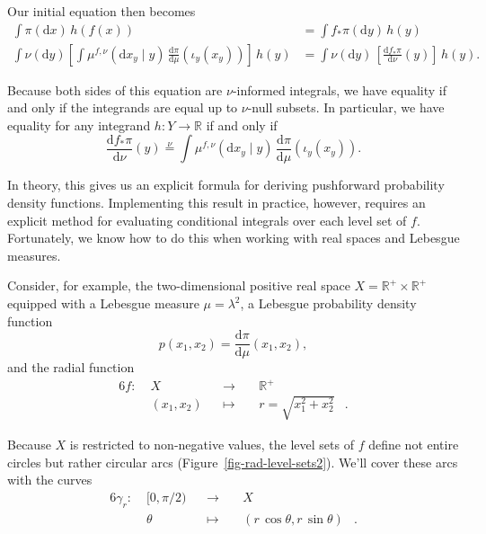 \documentclass[
  letterpaper,
  DIV=11,
  numbers=noendperiod]{scrartcl}
\begin{document}
Our initial equation then becomes \begin{align*}
\int \pi( \mathrm{d} x ) \, h(f(x))
&=
\int f_{*} \pi( \mathrm{d} y ) \, h(y)
\\
\int \nu( \mathrm{d} y )
\left[
  \int \mu^{f, \nu}( \mathrm{d} x_{y} \mid y ) \,
       \frac{ \mathrm{d} \pi}{ \mathrm{d} \mu }( \iota_{y}(x_{y}) )
\right] \, h(y)
&=
\int \nu( \mathrm{d} y ) \,
\left[ \frac{ \mathrm{d} f_{*}\pi}{ \mathrm{d} \nu }(y) \right] \, h(y).
\end{align*}

Because both sides of this equation are \(\nu\)-informed integrals, we
have equality if and only if the integrands are equal up to \(\nu\)-null
subsets. In particular, we have equality for any integrand
\(h : Y \rightarrow \mathbb{R}\) if and only if \[
\frac{ \mathrm{d} f_{*}\pi}{ \mathrm{d} \nu }(y)
\overset{\nu}{=}
\int \mu^{f, \nu}( \mathrm{d} x_{y} \mid y ) \,
\frac{ \mathrm{d} \pi}{ \mathrm{d} \mu }( \iota_{y}(x_{y}) ).
\]

In theory, this gives us an explicit formula for deriving pushforward
probability density functions. Implementing this result in practice,
however, requires an explicit method for evaluating conditional
integrals over each level set of \(f\). Fortunately, we know how to do
this when working with real spaces and Lebesgue measures.

Consider, for example, the two-dimensional positive real space
\(X = \mathbb{R}^{+} \times \mathbb{R}^{+}\) equipped with a Lebesgue
measure \(\mu = \lambda^{2}\), a Lebesgue probability density function
\[
p(x_{1}, x_{2}) = \frac{ \mathrm{d} \pi}{ \mathrm{d} \mu }(x_{1}, x_{2}),
\] and the radial function \begin{alignat*}{6}
f :\; &X& &\rightarrow& \; &\mathbb{R}^{+}&
\\
&(x_{1}, x_{2})& &\mapsto& &r = \sqrt{ x_{1}^{2} + x_{2}^{2} }&.
\end{alignat*}

Because \(X\) is restricted to non-negative values, the level sets of
\(f\) define not entire circles but rather circular arcs
(Figure~\ref{fig-rad-level-sets2}). We'll cover these arcs with the
curves \begin{alignat*}{6}
\gamma_{r} :\; &[0, \pi / 2 )& &\rightarrow& \; &X&
\\
&\theta& &\mapsto& &( r \, \cos \theta, r \, \sin \theta )&.
\end{alignat*}
\end{document}
